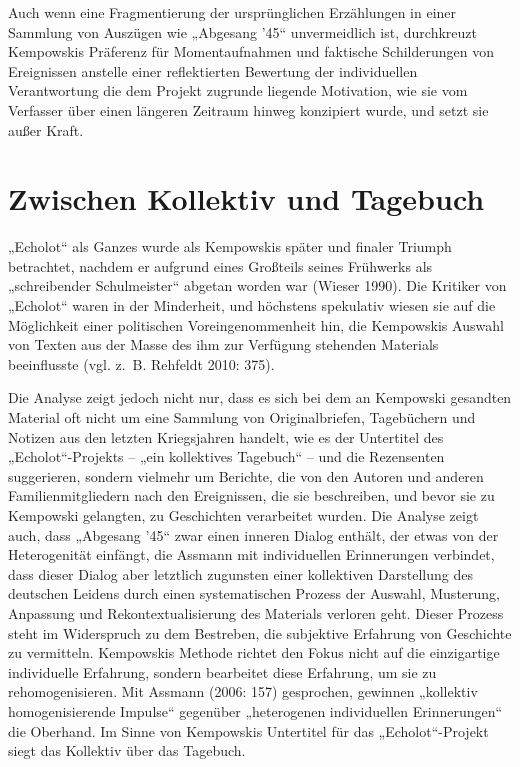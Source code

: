 \begin{multicols*}{2}
Auch wenn eine Fragmentierung der ursprünglichen Erzählungen in einer Sammlung von Auszügen wie „Abgesang ’45“ unvermeidlich ist, durchkreuzt Kempowskis Präferenz für Momentaufnahmen und faktische Schilderungen von Ereignissen anstelle einer reflektierten Bewertung der individuellen Verantwortung die dem Projekt zugrunde liegende Motivation, wie sie vom Verfasser über einen längeren Zeitraum hinweg konzipiert wurde, und setzt sie außer Kraft.

\section{Zwischen Kollektiv und Tagebuch}

\noindent „Echolot“ als Ganzes wurde als Kempowskis später und finaler Triumph betrachtet, nachdem er aufgrund eines Großteils seines Frühwerks als „schreibender Schulmeister“ abgetan worden war (Wieser 1990). Die Kritiker von „Echolot“ waren in der Minderheit, und höchstens spekulativ wiesen sie auf die Möglichkeit einer politischen Voreingenommenheit hin, die Kempowskis Auswahl von Texten aus der Masse des ihm zur Verfügung stehenden Materials beeinflusste (vgl. z. B. Rehfeldt 2010: 375).

Die Analyse zeigt jedoch nicht nur, dass es sich bei dem an Kempowski gesandten Material oft nicht um eine Sammlung von Originalbriefen, Tagebüchern und Notizen aus den letzten Kriegsjahren handelt, wie es der Untertitel des „Echolot“-Projekts – „ein kollektives Tagebuch“ – und die Rezensenten suggerieren, sondern vielmehr um Berichte, die von den Autoren und anderen Familienmitgliedern nach den Ereignissen, die sie beschreiben, und bevor sie zu Kempowski gelangten, zu Geschichten verarbeitet wurden. Die Analyse zeigt auch, dass „Abgesang ’45“ zwar einen inneren Dialog enthält, der etwas von der Heterogenität einfängt, die Assmann mit individuellen Erinnerungen verbindet, dass dieser Dialog aber letztlich zugunsten einer kollektiven Darstellung des deutschen Leidens durch einen systematischen Prozess der Auswahl, Musterung, Anpassung und Rekontextualisierung des Materials verloren geht. Dieser Prozess steht im Widerspruch zu dem Bestreben, die subjektive Erfahrung von Geschichte zu vermitteln. Kempowskis Methode richtet den Fokus nicht auf die einzigartige individuelle Erfahrung, sondern bearbeitet diese Erfahrung, um sie zu rehomogenisieren. Mit Assmann (2006: 157) gesprochen, gewinnen „kollektiv homogenisierende Impulse“ gegenüber „heterogenen individuellen Erinnerungen“ die Oberhand. Im Sinne von Kempowskis Untertitel für das „Echolot“-Projekt siegt das Kollektiv über das Tagebuch.


\end{multicols*}
